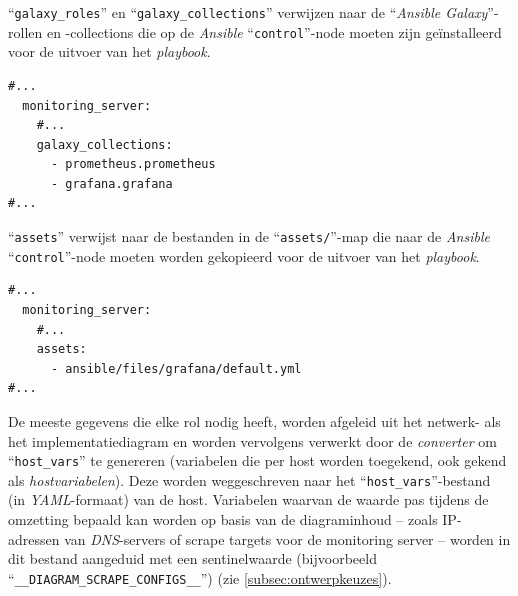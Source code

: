 ``\texttt{galaxy\_roles}'' en ``\texttt{galaxy\_collections}'' verwijzen naar de ``\emph{Ansible Galaxy}''-rollen en -collections die op de \emph{Ansible} ``\texttt{control}''-node moeten zijn geïnstalleerd voor de uitvoer van het \emph{playbook}.

\begin{codeblockfixed}
  \begin{codeblock}
    \begin{verbatim}
#...
  monitoring_server:
    #...
    galaxy_collections:
      - prometheus.prometheus
      - grafana.grafana
#...
\end{verbatim}
    \caption[``\texttt{galaxy\_collections}'' in ``\texttt{role-config.yml}'']{``\texttt{galaxy\_collections}''-key van een rol in ``\texttt{role-config.yml''} (analoog met ``\texttt{galaxy\_roles}'')}
    \label{code:vb_roleconfig_galaxy_collections}
  \end{codeblock}
\end{codeblockfixed}

``\texttt{assets}'' verwijst naar de bestanden in de ``\texttt{assets/}''-map die naar de \emph{Ansible} ``\texttt{control}''-node moeten worden gekopieerd voor de uitvoer van het \emph{playbook}.

\begin{codeblockfixed}
  \begin{codeblock}
    \begin{verbatim}
#...
  monitoring_server:
    #...
    assets:
      - ansible/files/grafana/default.yml
#...
\end{verbatim}
    \caption[``\texttt{assets}'' in ``\texttt{role-config.yml}'']{``\texttt{assets}''-key van een rol in ``\texttt{role-config.yml}''}
    \label{code:vb_roleconfig_assets}
  \end{codeblock}
\end{codeblockfixed}

De meeste gegevens die elke rol nodig heeft, worden afgeleid uit het netwerk- als het implementatiediagram en worden vervolgens verwerkt door de \emph{converter} om ``\texttt{host\_vars}'' te genereren (variabelen die per host worden toegekend, ook gekend als \emph{hostvariabelen}). Deze worden weggeschreven naar het ``\texttt{host\_vars}''-bestand (in \emph{YAML}-formaat) van de host.
Variabelen waarvan de waarde pas tijdens de omzetting bepaald kan worden op basis van de diagraminhoud -- zoals IP-adressen van \emph{DNS}-servers of scrape targets voor de monitoring server -- worden in dit bestand aangeduid met een sentinelwaarde (bijvoorbeeld ``\texttt{\_\_DIAGRAM\_SCRAPE\_CONFIGS\_\_}'') (zie \autoref{subsec:ontwerpkeuzes}).

